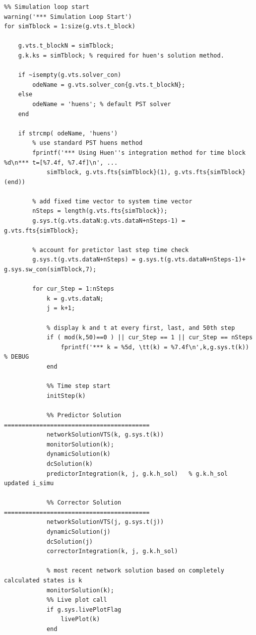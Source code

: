 \documentclass[12pt]{article}
\begin{document}
\begin{verbatim}
%% Simulation loop start
warning('*** Simulation Loop Start')
for simTblock = 1:size(g.vts.t_block)
    
    g.vts.t_blockN = simTblock;
    g.k.ks = simTblock; % required for huen's solution method.
    
    if ~isempty(g.vts.solver_con)
        odeName = g.vts.solver_con{g.vts.t_blockN};
    else
        odeName = 'huens'; % default PST solver
    end
    
    if strcmp( odeName, 'huens')
        % use standard PST huens method
        fprintf('*** Using Huen''s integration method for time block %d\n*** t=[%7.4f, %7.4f]\n', ...
            simTblock, g.vts.fts{simTblock}(1), g.vts.fts{simTblock}(end))
        
        % add fixed time vector to system time vector
        nSteps = length(g.vts.fts{simTblock});
        g.sys.t(g.vts.dataN:g.vts.dataN+nSteps-1) = g.vts.fts{simTblock};
        
        % account for pretictor last step time check
        g.sys.t(g.vts.dataN+nSteps) = g.sys.t(g.vts.dataN+nSteps-1)+ g.sys.sw_con(simTblock,7);
        
        for cur_Step = 1:nSteps
            k = g.vts.dataN;
            j = k+1;
            
            % display k and t at every first, last, and 50th step
            if ( mod(k,50)==0 ) || cur_Step == 1 || cur_Step == nSteps
                fprintf('*** k = %5d, \tt(k) = %7.4f\n',k,g.sys.t(k)) % DEBUG
            end
            
            %% Time step start
            initStep(k)
            
            %% Predictor Solution =========================================
            networkSolutionVTS(k, g.sys.t(k))
            monitorSolution(k);
            dynamicSolution(k)
            dcSolution(k)
            predictorIntegration(k, j, g.k.h_sol)   % g.k.h_sol updated i_simu
            
            %% Corrector Solution =========================================
            networkSolutionVTS(j, g.sys.t(j))
            dynamicSolution(j)
            dcSolution(j)
            correctorIntegration(k, j, g.k.h_sol)
            
            % most recent network solution based on completely calculated states is k
            monitorSolution(k);
            %% Live plot call
            if g.sys.livePlotFlag
                livePlot(k)
            end
            

\end{verbatim}
\end{document}

